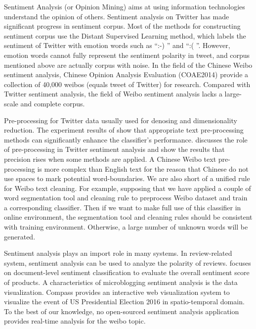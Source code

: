 \documentclass[runningheads]{llncs}
\begin{document}
Sentiment Analysis (or Opinion Mining) aims at using information technologies understand the opinion of others. Sentiment analysis on Twitter has made significant progress in sentiment corpus. Most of the methods for constructing sentiment corpus\cite{iosifidis2017large} use the Distant Supervised Learning method\cite{go2009twitter}, which labels the sentiment of Twitter with emotion words such as ``:-) '' and ``:( ''. However, emotion words cannot fully represent the sentiment polarity in tweet, and corpus mentioned above are actually corpus with noise. In the field of the Chinese Weibo sentiment analysis, Chinese Opinion Analysis Evaluation (COAE2014) \cite{Yang2015Task} provide a collection of 40,000 weibos (equals tweet of Twitter) for research. Compared with Twitter sentiment analysis, the field of Weibo sentiment analysis lacks a large-scale and complete corpus.

Pre-processing for Twitter data usually used for denosing and dimensionality reduction. The experiment results of \cite{haddi2013role} show that appropriate text pre-processing methods can significantly enhance the classifier's performance. \cite{bao2014role} discusses the role of pre-processing in Twitter sentiment analysis and show the results that precision rises when some methods are applied. A
Chinese Weibo text pre-processing is more complex than English text for the reason that Chinese do not use spaces to mark potential word-boundaries. We are also short of a unified rule for Weibo text cleaning. For example, supposing that we have applied a couple of word segmentation tool and cleaning rule to preprocess Weibo dataset and train a corresponding classifier. Then if we want to make full use of this classifier in online environment, the segmentation tool and cleaning rules should be consistent with training environment. Otherwise, a large number of unknown words will be generated.

Sentiment analysis plays an import role in many systems. In review-related system, sentiment analysis can be used to analyze the polarity of reviews. \cite{song2019distilling} focuses on document-level sentiment classification to evaluate the overall sentiment score of products. A characteristics of microblogging sentiment analysis is the data visualization. Compass \cite{paul2017compass} provides an interactive web visualization system to visualize the event of US Presidential Election 2016 in spatio-temporal domain. To the best of our knowledge, no open-sourced sentiment analysis application provides real-time analysis for the weibo topic.
\end{document}
